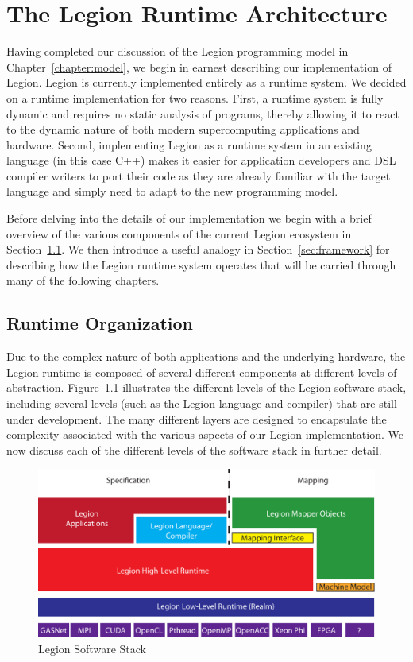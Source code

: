 

\chapter{The Legion Runtime Architecture}
\label{chapter:arch}
Having completed our discussion of the Legion
programming model in Chapter~\ref{chapter:model},
we begin in earnest describing our implementation 
of Legion. Legion is currently implemented entirely 
as a runtime system. We decided on a runtime implementation 
for two reasons. First, a runtime system is fully dynamic 
and requires no static analysis of programs, thereby allowing 
it to react to the dynamic nature of both modern 
supercomputing applications and hardware. Second, 
implementing Legion as a runtime system in an existing 
language (in this case C++) makes it easier for application 
developers and DSL compiler writers to port their code as 
they are  already familiar with the target language and simply 
need to adapt to the new programming model.

Before delving into the details of our implementation
we begin with a brief overview of the various
components of the current Legion ecosystem in
Section~\ref{sec:components}.  We then introduce
a useful analogy in Section~\ref{sec:framework}
for describing how the Legion runtime system operates
that will be carried through many of the following
chapters.

\section{Runtime Organization}
\label{sec:components}
Due to the complex nature of both applications and
the underlying hardware, the Legion runtime is composed
of several different components at different levels of
abstraction. Figure~\ref{fig:softwarestack} illustrates
the different levels of the Legion software stack, 
including several levels (such as the Legion language
and compiler) that are still under development. 
The many different layers are designed to encapsulate
the complexity associated with the various aspects of 
our Legion implementation. We now discuss each of the 
different levels of the software stack in further detail.

\begin{figure}[ht]
\begin{center}
\includegraphics[scale=0.6]{figs/LegionSoftwareStack.pdf}
\end{center}
\caption{Legion Software Stack\label{fig:softwarestack}}
\end{figure}

